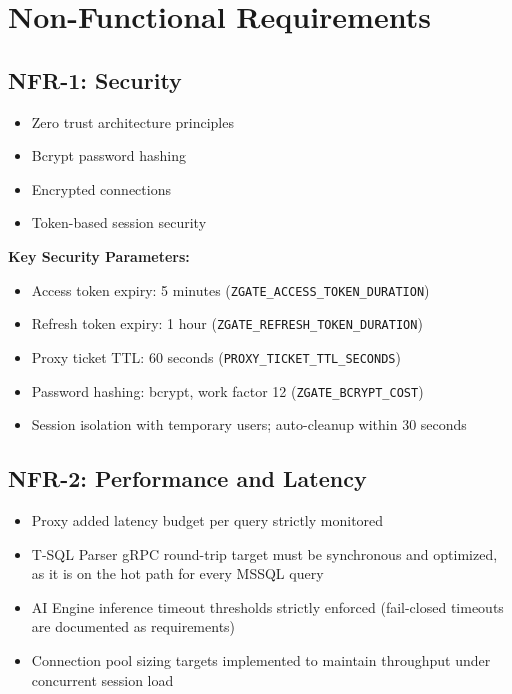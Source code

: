 \section{Non-Functional Requirements}

\subsection{NFR-1: Security}
\begin{itemize}
    \item Zero trust architecture principles
    \item Bcrypt password hashing
    \item Encrypted connections
    \item Token-based session security
\end{itemize}

\textbf{Key Security Parameters:}
\begin{itemize}
    \item Access token expiry: 5 minutes (\texttt{ZGATE\_ACCESS\_TOKEN\_DURATION})
    \item Refresh token expiry: 1 hour (\texttt{ZGATE\_REFRESH\_TOKEN\_DURATION})
    \item Proxy ticket TTL: 60 seconds (\texttt{PROXY\_TICKET\_TTL\_SECONDS})
    \item Password hashing: bcrypt, work factor 12 (\texttt{ZGATE\_BCRYPT\_COST})
    \item Session isolation with temporary users; auto-cleanup within 30 seconds
\end{itemize}

\subsection{NFR-2: Performance and Latency}
\begin{itemize}
    \item Proxy added latency budget per query strictly monitored
    \item T-SQL Parser gRPC round-trip target must be synchronous and optimized, as it is on the hot path for every MSSQL query
    \item AI Engine inference timeout thresholds strictly enforced (fail-closed timeouts are documented as requirements)
    \item Connection pool sizing targets implemented to maintain throughput under concurrent session load
\end{itemize}

